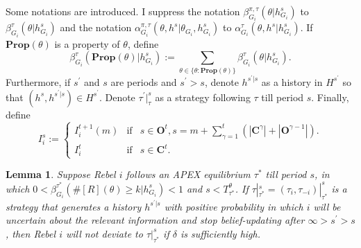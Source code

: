 \documentclass[12pt,letter]{article}
\newcommand{\Kappa}{\mathbf{C}}
\newcommand{\Omicron}{\mathbf{O}}
\newtheorem{lemma}{Lemma}[section]
\theoremstyle{definition}
\theoremstyle{remark}
\theoremstyle{claim}
\begin{document}
Some notations are introduced. I suppress the notation $\beta^{\pi,\tau}_{G_i}(\theta|h^s_{G_i})$ to $\beta^{\tau}_{G_i}(\theta|h^s_{G_i})$ and the notation $\alpha^{\pi,\tau}_{G_i}(\theta, h^{s}|\theta_{G_i},h^{s}_{G_i})$ to $\alpha^{\tau}_{G_i}(\theta, h^{s}|h^{s}_{G_i})$. If $\mathbf{Prop}(\theta)$ is a property of $\theta$, define \[\beta^{\tau}_{G_i}(\mathbf{Prop}(\theta)|h^s_{G_i}):= \sum_{\theta\in\{\theta:\mathbf{Prop}(\theta)\}}\beta^{\tau}_{G_i}(\theta|h^s_{G_i}).\] Furthermore, if $s^{'}$ and $s$ are periods and $s^{'}>s$, denote $h^{s^{'}|s}$ as a history in $H^{s^{'}}$ so that $(h^s,h^{s^{'}|s})\in H^{s^{'}}$. Denote $\tau^{'}|^s_{\tau}$ as a strategy following $\tau$ till period $s$. Finally, define
\[
    I^s_i:=\left\{
                \begin{array}{lcl}
                  I^{t+1}_i(m) & \text{if} & s\in \Omicron^t, s=m+\sum^t_{\gamma=1}(|\Kappa^{\gamma}|+|\Omicron^{\gamma-1}|).\\
                 I^{t}_i & \text{if} & s\in \Kappa^t.
                \end{array}
              \right. 
\]


\begin{lemma}
\label{lemma:uncertain}
Suppose Rebel $i$ follows an APEX equilibrium $\tau^{*}$ till period $s$, in which $0<\beta^{\tau^{*}}_{G_i}(\#[R](\theta)\geq k|h^s_{G_i})<1$ and $s<T^{\theta}_{\tau^{*}}$. If $\tau|^s_{\tau^{*}}=(\tau_i,\tau_{-i})|^s_{\tau^{*}}$ is a strategy that generates a history $h^{s^{'}|s}$ with positive probability in which $i$ will be uncertain about the relevant information and stop belief-updating after $\infty> s^{'}>s$, then Rebel $i$ will not deviate to $\tau|^s_{\tau^{*}}$ if $\delta$ is sufficiently high.
\end{lemma}
\end{document}
